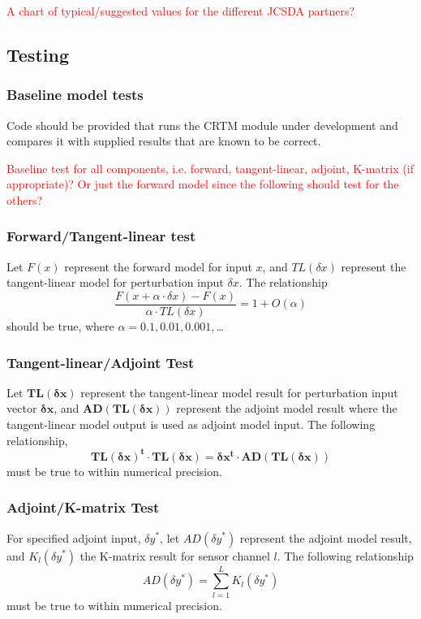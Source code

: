 \textcolor{red}{A chart of typical/suggested values for the different JCSDA partners?}


\subsection{Testing}
\subsubsection{Baseline model tests}
Code should be provided that runs the CRTM module under development and compares it with  supplied results that are known to be correct.

\textcolor{red}{Baseline test for all components, i.e. forward, tangent-linear, adjoint, K-matrix (if appropriate)? Or just the forward model since the following should test for the others?}


\subsubsection{Forward/Tangent-linear test}
Let $F(x)$ represent the forward model for input $x$, and $TL(\delta x)$ represent the tangent-linear model for perturbation input $\delta x$. The relationship
\begin{equation}
  \frac{F(x+\alpha\cdot\delta x) - F(x)}{\alpha\cdot TL(\delta x)} = 1+O(\alpha)
\end{equation}
should be true, where $\alpha = 0.1,0.01,0.001,$\ldots

\subsubsection{Tangent-linear/Adjoint Test}
Let $\mathbf{TL(\delta x)}$ represent the tangent-linear model result for perturbation input vector  $\mathbf{\delta x}$, and $\mathbf{AD\left(TL(\delta x)\right)}$ represent the adjoint model result where the tangent-linear model output is used as adjoint model input. The following relationship,
\begin{equation}
  \mathbf{TL(\delta x)^{t}\cdot TL(\delta x) = \delta x^{t}\cdot AD\left(TL(\delta x)\right)}
\end{equation}
must be true to within numerical precision.

\subsubsection{Adjoint/K-matrix Test}
For specified adjoint input, $\delta y^{*}$, let $AD(\delta y^{*})$ represent the adjoint model result, and $K_{l}(\delta y^{*})$ the K-matrix result for sensor channel $l$. The following relationship
\begin{equation}
  AD(\delta y^{*}) = \sum_{l=1}^{L} K_{l}(\delta y^{*})
\end{equation}
must be true to within numerical precision. 


